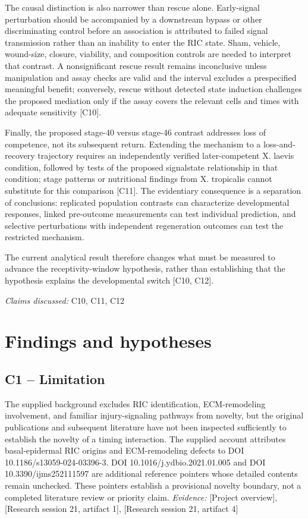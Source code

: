 \documentclass[11pt]{article}
\begin{document}
The causal distinction is also narrower than rescue alone. Early-signal perturbation should be accompanied by a downstream bypass or other discriminating control before an association is attributed to failed signal transmission rather than an inability to enter the RIC state. Sham, vehicle, wound-size, closure, viability, and composition controls are needed to interpret that contrast. A nonsignificant rescue result remains inconclusive unless manipulation and assay checks are valid and the interval excludes a prespecified meaningful benefit; conversely, rescue without detected state induction challenges the proposed mediation only if the assay covers the relevant cells and times with adequate sensitivity [C10].

Finally, the proposed stage-40 versus stage-46 contrast addresses loss of competence, not its subsequent return. Extending the mechanism to a loss-and-recovery trajectory requires an independently verified later-competent X. laevis condition, followed by tests of the proposed signal\textendash{}state relationship in that condition; stage patterns or nutritional findings from X. tropicalis cannot substitute for this comparison [C11]. The evidentiary consequence is a separation of conclusions: replicated population contrasts can characterize developmental responses, linked pre-outcome measurements can test individual prediction, and selective perturbations with independent regeneration outcomes can test the restricted mechanism.

The current analytical result therefore changes what must be measured to advance the receptivity-window hypothesis, rather than establishing that the hypothesis explains the developmental switch [C10, C12].

\textit{Claims discussed: }C10, C11, C12
\section{Findings and hypotheses}
\subsection{C1 -- Limitation}
The supplied background excludes RIC identification, ECM-remodeling involvement, and familiar injury-signaling pathways from novelty, but the original publications and subsequent literature have not been inspected sufficiently to establish the novelty of a timing interaction.
The supplied account attributes basal-epidermal RIC origins and ECM-remodeling defects to DOI 10.1186/s13059-024-03396-3. DOI 10.1016/j.ydbio.2021.01.005 and DOI 10.3390/ijms252111597 are additional reference pointers whose detailed contents remain unchecked. These pointers establish a provisional novelty boundary, not a completed literature review or priority claim.
\textit{Evidence: }[Project overview], [Research session 21, artifact 1], [Research session 21, artifact 4]
\end{document}

